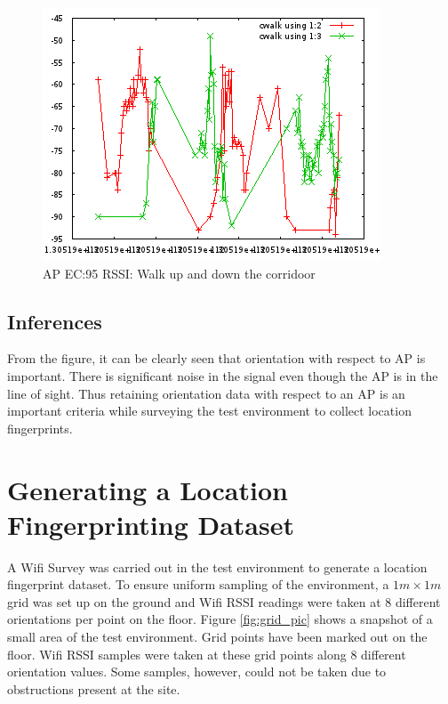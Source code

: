\begin{figure}\centering
    \includegraphics{figures/wifi_corridoor_walk.png}
    \caption{AP EC:95 RSSI: Walk up and down the corridoor\label{fig:wifi_corridoor_walk}}
\end{figure}


\subsection{Inferences}
From the figure, it can be clearly seen that orientation with respect to 
AP is important. There is significant noise in the signal even though the AP 
is in the line of sight. Thus retaining orientation data with respect to 
an AP is an important criteria while surveying the test environment to 
collect location fingerprints.

\section{Generating a Location Fingerprinting Dataset}

A Wifi Survey was carried out in the test environment to generate a location 
fingerprint dataset. To ensure uniform sampling of the environment, 
a $1m \times 1m$ grid was set up on the ground and Wifi RSSI readings were taken 
at 8 different orientations per point on the floor. 
Figure \ref{fig:grid_pic} shows a snapshot of a small area of the test environment.
Grid points have been marked out on the floor. 
Wifi RSSI samples were taken at these grid points along 8 different orientation 
values. Some samples, however, could not be taken due to obstructions 
present at the site.

